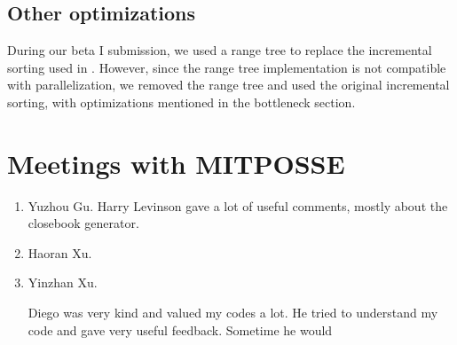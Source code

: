 \documentclass[10pt,twosidep]{article}
\begin{document}
\subsection{Other optimizations}
During our beta I submission, we used a range tree to replace the incremental sorting used in \scs. However, since the range tree implementation is not compatible with parallelization, we removed the range tree and used the original incremental sorting, with optimizations mentioned in the bottleneck section.

\section{Meetings with MITPOSSE}
\begin{enumerate}
	\item Yuzhou Gu.
	Harry Levinson gave a lot of useful comments, mostly about the closebook generator.
	\item Haoran Xu.
	\item Yinzhan Xu.
	
	Diego was very kind and valued my codes a lot. He tried to understand my code and gave very useful feedback. Sometime he would 
\end{enumerate}
\end{document}
